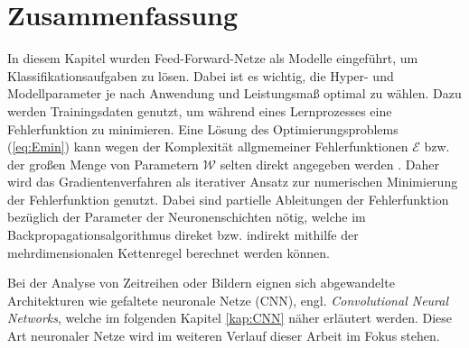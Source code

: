 \section{Zusammenfassung}
\label{abs:NN_conc}
In diesem Kapitel wurden Feed-Forward-Netze als Modelle eingeführt, um Klassifikationsaufgaben zu lösen. Dabei ist es wichtig, die Hyper- und Modellparameter je nach Anwendung und Leistungsmaß optimal zu wählen. Dazu werden Trainingsdaten genutzt, um während eines Lernprozesses eine Fehlerfunktion zu minimieren. Eine Lösung des Optimierungsproblems (\ref{eq:Emin}) kann wegen der Komplexität allgmemeiner Fehlerfunktionen $\mathcal{E}$ bzw. der großen Menge von Parametern $\mathcal{W}$ selten direkt angegeben werden \cite{blum1992training}. Daher wird das Gradientenverfahren als iterativer Ansatz zur numerischen Minimierung der Fehlerfunktion genutzt. Dabei sind partielle Ableitungen der Fehlerfunktion bezüglich der Parameter der Neuronenschichten nötig, welche im Backpropagationsalgorithmus direket bzw. indirekt mithilfe der mehrdimensionalen Kettenregel berechnet werden können. 

Bei der Analyse von Zeitreihen oder Bildern eignen sich abgewandelte Architekturen wie gefaltete neuronale Netze (CNN), engl. \textit{Convolutional Neural Networks}, welche im folgenden Kapitel \ref{kap:CNN} näher erläutert werden. Diese Art neuronaler Netze wird im weiteren Verlauf dieser Arbeit im Fokus stehen.